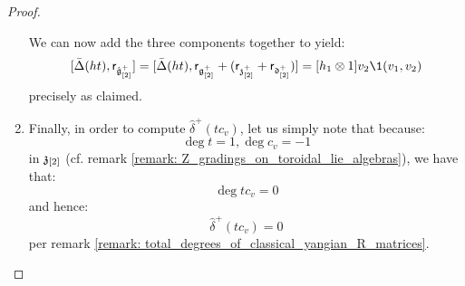 \begin{proof}
\begin{enumerate}
                    We can now add the three components together to yield:
                        $$[\bar{\Delta}(ht), \sfr_{\hat{\g}_{[2]}^+}] = [ \bar{\Delta}(ht), \sfr_{\g_{[2]}^+} + (\sfr_{\z_{[2]}^+} + \sfr_{\d_{[2]}^+}) ] =  [h_1 \tensor 1] v_2 \1(v_1, v_2)$$
                    precisely as claimed. 
                    
                    \item Finally, in order to compute $\hat{\delta}^+(t c_v)$, let us simply note that because:
                        $$\deg t = 1, \deg c_v = -1$$
                    in $\mathfrak{z}_{[2]}$ (cf. remark \ref{remark: Z_gradings_on_toroidal_lie_algebras}), we have that:
                        $$\deg t c_v = 0$$
                    and hence:
                        $$\hat{\delta}^+(t c_v) = 0$$
                    per remark \ref{remark: total_degrees_of_classical_yangian_R_matrices}.
                \end{enumerate}
            \end{proof}

